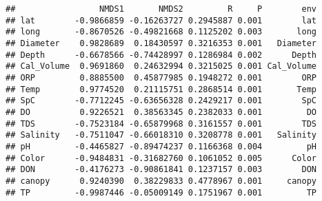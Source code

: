 \documentclass[
]{article}
\begin{document}
\begin{verbatim}
##                 NMDS1       NMDS2         R     P        env
## lat        -0.9866859 -0.16263727 0.2945887 0.001        lat
## long       -0.8670526 -0.49821668 0.1125202 0.003       long
## Diameter    0.9828689  0.18430597 0.3216353 0.001   Diameter
## Depth      -0.6678566 -0.74428997 0.1286984 0.002      Depth
## Cal_Volume  0.9691860  0.24632994 0.3215025 0.001 Cal_Volume
## ORP         0.8885500  0.45877985 0.1948272 0.001        ORP
## Temp        0.9774520  0.21115751 0.2868514 0.001       Temp
## SpC        -0.7712245 -0.63656328 0.2429217 0.001        SpC
## DO          0.9226521  0.38563345 0.2382033 0.001         DO
## TDS        -0.7523184 -0.65879968 0.3161557 0.001        TDS
## Salinity   -0.7511047 -0.66018310 0.3208778 0.001   Salinity
## pH         -0.4465827 -0.89474237 0.1166368 0.004         pH
## Color      -0.9484831 -0.31682760 0.1061052 0.005      Color
## DON        -0.4176273 -0.90861841 0.1237157 0.003        DON
## canopy      0.9240390  0.38229833 0.4778967 0.001     canopy
## TP         -0.9987446 -0.05009149 0.1751967 0.001         TP
\end{verbatim}
\end{document}
